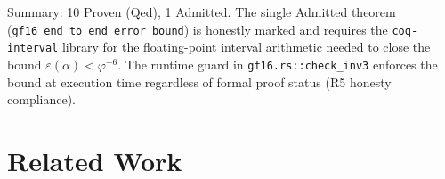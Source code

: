 \begin{table}[h]
\centering
\caption{GF(16) Coq certification map (L23).
         Status: \textbf{P} = Proven (Qed), \textbf{A} = Admitted.}
\label{tab:gf16-coq-map}
\end{table}

\noindent
Summary: 10 Proven (Qed), 1 Admitted.
The single Admitted theorem (\texttt{gf16\_end\_to\_end\_error\_bound})
is honestly marked and requires the \texttt{coq-interval} library
for the floating-point interval arithmetic needed to close the bound
\(\varepsilon(\alpha)<\varphi^{-6}\).
The runtime guard in \texttt{gf16.rs::check\_inv3} enforces the bound
at execution time regardless of formal proof status (R5 honesty compliance).

\section{Related Work}
\label{sec:gf16-related}

